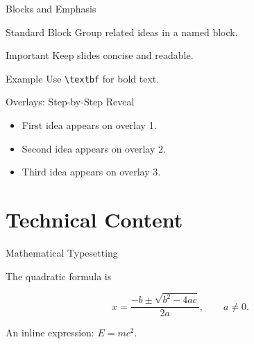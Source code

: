 \documentclass[aspectratio=169,11pt]{beamer}
\begin{document}
\begin{frame}{Blocks and Emphasis}

    \begin{block}{Standard Block}
        Group related ideas in a named block.
    \end{block}

    \begin{alertblock}{Important}
        Keep slides concise and readable.
    \end{alertblock}

    \begin{exampleblock}{Example}
        Use \texttt{\textbackslash textbf}
        for bold text.
    \end{exampleblock}

\end{frame}

\begin{frame}{Overlays: Step-by-Step Reveal}

    \begin{itemize}

        \item<1->
        First idea appears on overlay 1.

        \item<2->
        Second idea appears on overlay 2.

        \item<3->
        Third idea appears on overlay 3.

    \end{itemize}

\end{frame}

\section{Technical Content}

\begin{frame}{Mathematical Typesetting}

    The quadratic formula is

    \[
        x =
        \frac{-b \pm \sqrt{b^2-4ac}}{2a},
        \qquad a \neq 0.
    \]

    \vspace{0.5cm}

    An inline expression:
    $E = mc^2$.

\end{frame}
\end{document}
